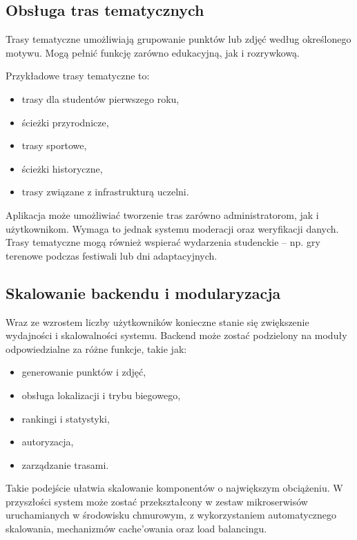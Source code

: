 \subsection{Obsługa tras tematycznych}

Trasy tematyczne umożliwiają grupowanie punktów lub zdjęć według określonego motywu. Mogą pełnić funkcję zarówno edukacyjną, jak i rozrywkową.

Przykładowe trasy tematyczne to:
\begin{itemize}
    \item trasy dla studentów pierwszego roku,
    \item ścieżki przyrodnicze,
    \item trasy sportowe,
    \item ścieżki historyczne,
    \item trasy związane z infrastrukturą uczelni.
\end{itemize}

Aplikacja może umożliwiać tworzenie tras zarówno administratorom, jak i użytkownikom. Wymaga to jednak systemu moderacji oraz weryfikacji danych. Trasy tematyczne mogą również wspierać wydarzenia studenckie -- np. gry terenowe podczas festiwali lub dni adaptacyjnych.

\pagebreak

\subsection{Skalowanie backendu i modularyzacja}

Wraz ze wzrostem liczby użytkowników konieczne stanie się zwiększenie wydajności i skalowalności systemu. Backend może zostać podzielony na moduły odpowiedzialne za różne funkcje, takie jak:
\begin{itemize}
    \item generowanie punktów i zdjęć,
    \item obsługa lokalizacji i trybu biegowego,
    \item rankingi i statystyki,
    \item autoryzacja,
    \item zarządzanie trasami.
\end{itemize}

Takie podejście ułatwia skalowanie komponentów o największym obciążeniu. W przyszłości system może zostać przekształcony w zestaw mikroserwisów uruchamianych w środowisku chmurowym, z wykorzystaniem automatycznego skalowania, mechanizmów cache'owania oraz load balancingu.

